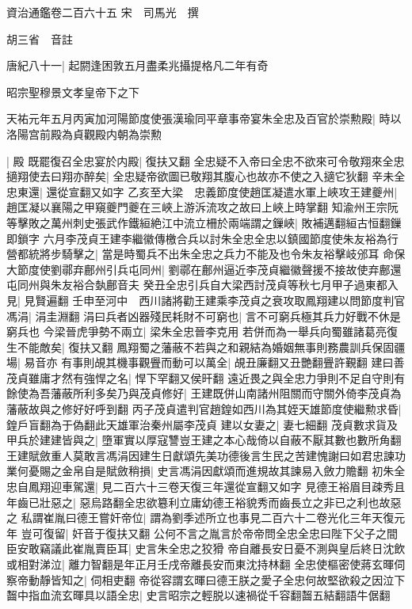 資治通鑑卷二百六十五
宋　司馬光　撰

胡三省　音註

唐紀八十一|{
	起閼逢困敦五月盡柔兆攝提格凡二年有奇}


昭宗聖穆景文孝皇帝下之下

天祐元年五月丙寅加河陽節度使張漢瑜同平章事帝宴朱全忠及百官於崇勲殿|{
	時以洛陽宫前殿為貞觀殿内朝為崇勲}


|{
	殿}
既罷復召全忠宴於内殿|{
	復扶又翻}
全忠疑不入帝曰全忠不欲來可令敬翔來全忠擿翔使去曰翔亦醉矣|{
	全忠疑帝欲圖已敬翔其腹心也故亦不使之入擿它狄翻}
辛未全忠東還|{
	還從宣翻又如字}
乙亥至大梁　忠義節度使趙匡凝遣水軍上峽攻王建夔州|{
	趙匡凝以襄陽之甲窺夔門夔在三峽上游泝流攻之故曰上峽上時掌翻}
知渝州王宗阮等擊敗之萬州刺史張武作鐵絙絶江中流立柵於兩端謂之鏁峽|{
	敗補邁翻絙古恒翻鏁即鎖字}
六月李茂貞王建李繼徽傳檄合兵以討朱全忠全忠以鎮國節度使朱友裕為行營都統將步騎擊之|{
	當是時蜀兵不出朱全忠之兵力不能及也令朱友裕擊岐邠耳}
命保大節度使劉鄩弃鄜州引兵屯同州|{
	劉鄩在鄜州逼近李茂貞繼徽聲援不接故使弃鄜還屯同州與朱友裕合埶鄜音夫}
癸丑全忠引兵自大梁西討茂貞等秋七月甲子過東都入見|{
	見賢遍翻}
壬申至河中　西川諸將勸王建乘李茂貞之衰攻取鳳翔建以問節度判官馮涓|{
	涓圭淵翻}
涓曰兵者凶器殘民耗財不可窮也|{
	言不可窮兵極其兵力好戰不休是窮兵也}
今梁晉虎爭勢不兩立|{
	梁朱全忠晉李克用}
若併而為一舉兵向蜀雖諸葛亮復生不能敵矣|{
	復扶又翻}
鳳翔蜀之藩蔽不若與之和親結為婚姻無事則務農訓兵保固疆場|{
	易音亦}
有事則覘其機事觀舋而動可以萬全|{
	覘丑廉翻又丑艷翻舋許覲翻}
建曰善茂貞雖庸才然有強悍之名|{
	悍下罕翻又侯旰翻}
遠近畏之與全忠力爭則不足自守則有餘使為吾藩蔽所利多矣乃與茂貞修好|{
	王建既併山南諸州阻關而守關外倚李茂貞為藩蔽故與之修好好呼到翻}
丙子茂貞遣判官趙鍠如西川為其姪天雄節度使繼勲求昏|{
	鍠戶盲翻為于偽翻此天雄軍治秦州屬李茂貞}
建以女妻之|{
	妻七細翻}
茂貞數求貨及甲兵於建建皆與之|{
	墮軍實以厚寇讐豈王建之本心哉倚以自蔽不厭其數也數所角翻}
王建賦斂重人莫敢言馮涓因建生日獻頌先美功德後言生民之苦建愧謝曰如君忠諫功業何憂賜之金帛自是賦斂稍損|{
	史言馮涓因獻頌而進規故其諫易入斂力贍翻}
初朱全忠自鳳翔迎車駕還|{
	見二百六十三卷天復三年還從宣翻又如字}
見德王裕眉目疎秀且年齒已壯惡之|{
	惡烏路翻全忠欲簒利立庸幼德王裕貌秀而齒長立之非已之利也故惡之}
私謂崔胤曰德王嘗奸帝位|{
	謂為劉季述所立也事見二百六十二卷光化三年天復元年}
豈可復留|{
	奸音于復扶又翻}
公何不言之胤言於帝帝問全忠全忠曰陛下父子之間臣安敢竊議此崔胤賣臣耳|{
	史言朱全忠之狡猾}
帝自離長安日憂不測與皇后終日沈飲或相對涕泣|{
	離力智翻是年正月壬戌帝離長安而東沈持林翻}
全忠使樞密使蔣玄暉伺察帝動靜皆知之|{
	伺相吏翻}
帝從容謂玄暉曰德王朕之愛子全忠何故堅欲殺之因泣下齧中指血流玄暉具以語全忠|{
	史言昭宗之輕脱以速禍從千容翻齧五結翻語牛倨翻}

